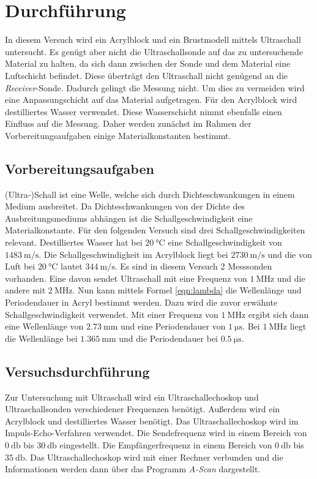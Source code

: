 \section{Durchführung}
\label{sec:Durchführung}
In diesem Versuch wird ein Acrylblock und ein Brustmodell mittels Ultraschall untersucht. Es genügt aber nicht die Ultraschallsonde auf das zu untersuchende Material zu halten, da sich dann
zwischen der Sonde und dem Material eine Luftschicht befindet. Diese überträgt den Ultraschall nicht genügend an die \textit{Receiver}-Sonde. Dadurch gelingt die Messung nicht. Um dies zu vermeiden
wird eine Anpassungschicht auf das Material aufgetragen. Für den Acrylblock wird destilliertes Wasser verwendet. Diese Wasserschicht nimmt ebenfalls einen Einfluss auf die Messung. Daher werden
zunächst im Rahmen der Vorbereitungsaufgaben einige Materialkonstanten bestimmt.
\subsection{Vorbereitungsaufgaben}
\label{subsec:VBA}
(Ultra-)Schall ist eine Welle, welche sich durch Dichteschwankungen in einem Medium ausbreitet. Da Dichteschwankungen von der Dichte des Ausbreitungsmediums abhängen ist die Schallgeschwindigkeit
eine  Materialkonstante. Für den folgenden Versuch sind drei Schallgeschwindigkeiten relevant. Destilliertes Wasser hat bei $\qty{20}{\celsius}$ eine Schallgeschwindigkeit von $\qty{1483}{\metre\per\second}$.
Die Schallgeschwindigkeit im Acrylblock liegt bei $\qty{2730}{\metre\per\second}$ und die von Luft bei $\qty{20}{\celsius}$ lautet $\qty{344}{\metre\per\second}$.
Es sind in diesem Versuch 2 Messsonden vorhanden. Eine davon sendet Ultraschall mit eine Frequenz von $\qty{1}{\mega\hertz}$ und die andere mit $\qty{2}{\mega\hertz}$. Nun kann mittels Formel
\eqref{eqn:lambda} die Wellenlänge und Periodendauer in Acryl bestimmt werden. Dazu wird die zuvor erwähnte Schallgeschwindigkeit
verwendet. Mit einer Frequenz von $\qty{1}{\mega\hertz}$ ergibt sich dann eine Wellenlänge von $\qty{2.73}{\milli\metre}$ und eine Periodendauer von $\qty{1}{\micro\second}$. Bei $\qty{1}{\mega\hertz}$
liegt die Wellenlänge bei $\qty{1.365}{\milli\metre}$ und die Periodendauer bei $\qty{0.5}{\micro\second}$.
\subsection{Versuchsdurchführung}
\label{subsec:Versuchsdurchführung}
Zur Untersuchung mit Ultraschall wird ein Ultraschallechoskop und Ultraschallsonden verschiedener Frequenzen benötigt. Außerdem wird ein Acrylblock und destilliertes Wasser benötigt. 
Das Ultraschallechoskop wird im Impuls-Echo-Verfahren verwendet. Die Sendefrequenz wird in einem Bereich von $\qty{0}{\decibel}$ bis $\qty{30}{\decibel}$ eingestellt. Die 
Empfängerfrequenz in einem Bereich von $\qty{0}{\decibel}$ bis $\qty{35}{\decibel}$. Das Ultraschallechoskop wird mit einer Rechner verbunden und die Informationen werden dann 
über das Programm \textit{A-Scan} dargestellt. 


